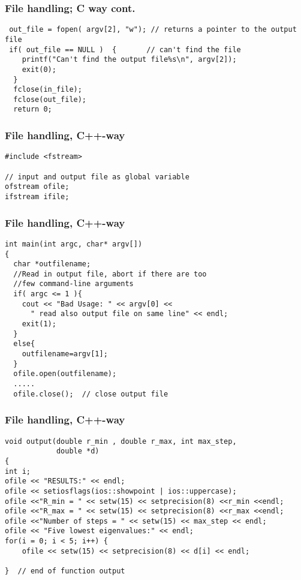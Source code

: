 \documentclass{beamer}
\begin{document}
\begin{frame}
\frametitle{File handling; C way cont.}

\begin{verbatim}
 out_file = fopen( argv[2], "w"); // returns a pointer to the output file
 if( out_file == NULL )  {       // can't find the file
    printf("Can't find the output file%s\n", argv[2]);
    exit(0);
  }
  fclose(in_file);
  fclose(out_file);
  return 0;
\end{verbatim}
\end{frame}

\begin{frame}
\frametitle{File handling, C++-way}

\begin{verbatim}
#include <fstream>

// input and output file as global variable
ofstream ofile;
ifstream ifile;
\end{verbatim}
\end{frame}

\begin{frame}
\frametitle{File handling, C++-way}

\begin{verbatim}
int main(int argc, char* argv[])
{
  char *outfilename;
  //Read in output file, abort if there are too
  //few command-line arguments
  if( argc <= 1 ){
    cout << "Bad Usage: " << argv[0] <<
      " read also output file on same line" << endl;
    exit(1);
  }
  else{
    outfilename=argv[1];
  }
  ofile.open(outfilename);
  .....
  ofile.close();  // close output file
\end{verbatim}
\end{frame}

\begin{frame}
\frametitle{File handling, C++-way}

\begin{verbatim}
void output(double r_min , double r_max, int max_step,
            double *d)
{
int i;
ofile << "RESULTS:" << endl;
ofile << setiosflags(ios::showpoint | ios::uppercase);
ofile <<"R_min = " << setw(15) << setprecision(8) <<r_min <<endl;
ofile <<"R_max = " << setw(15) << setprecision(8) <<r_max <<endl;
ofile <<"Number of steps = " << setw(15) << max_step << endl;
ofile << "Five lowest eigenvalues:" << endl;
for(i = 0; i < 5; i++) {
    ofile << setw(15) << setprecision(8) << d[i] << endl;

}  // end of function output
\end{verbatim}
\end{frame}
\end{document}
